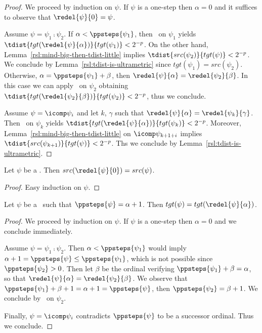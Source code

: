 \begin{proof}
We proceed by induction on $\psi$.
If $\psi$ is a one-step then $\alpha = 0$ and it suffices to observe that $\redel{\psi}{0} = \psi$.

Assume $\psi = \psi_1 \comp \psi_2$.
If $\alpha < \ppsteps{\psi_1}$, then \ih\ on $\psi_1$ yields $\tdist{tgt(\redel{\psi}{\alpha})}{tgt(\psi_1)} < 2^{-p}$.
On the other hand, Lemma~\ref{rsl:mind-big-then-tdist-little} implies $\tdist{src(\psi_2)}{tgt(\psi)} < 2^{-p}$.
We conclude by Lemma~\ref{rsl:tdist-is-ultrametric} since $tgt(\psi_1) = src(\psi_2)$.
Otherwise, $\alpha = \ppsteps{\psi_1} + \beta$, then $\redel{\psi}{\alpha} = \redel{\psi_2}{\beta}$.
In this case we can apply \ih\ on $\psi_2$ obtaining $\tdist{tgt(\redel{\psi_2}{\beta})}{tgt(\psi_2)} < 2^{-p}$, thus we conclude.

Assume $\psi = \icomp \psi_i$ and let $k$, $\gamma$ such that $\redel{\psi}{\alpha} = \redel{\psi_k}{\gamma}$.
Then \ih\ on $\psi_k$ yields $\tdist{tgt(\redel{\psi}{\alpha})}{tgt(\psi_k)} < 2^{-p}$.
Moreover, Lemma~\ref{rsl:mind-big-then-tdist-little} on $\icomp \psi_{k+1+i}$ implies $\tdist{src(\psi_{k+1})}{tgt(\psi)} < 2^{-p}$. Ths we conclude by Lemma~\ref{rsl:tdist-is-ultrametric}.
\end{proof}

\begin{lemma}
\label{rsl:ppterm-src}
Let $\psi$ be a \ppterm. Then $src(\redel{\psi}{0}) = src(\psi)$.
\end{lemma}

\begin{proof}
Easy induction on $\psi$.
\end{proof}

\begin{lemma}
\label{rsl:ppterm-tgt-successor}
Let $\psi$ be a \ppterm\ such that $\ppsteps{\psi} = \alpha + 1$. Then $tgt(\psi) = tgt(\redel{\psi}{\alpha})$.
\end{lemma}

\begin{proof}
We proceed by induction on $\psi$.
If $\psi$ is a one-step then $\alpha = 0$ and we conclude immediately.

Assume $\psi = \psi_1 \comp \psi_2$.
Then $\alpha < \ppsteps{\psi_1}$ would imply $\alpha + 1 = \ppsteps{\psi} \leq \ppsteps{\psi_1}$, which is not possible since $\ppsteps{\psi_2} > 0$.
Then let $\beta$ be the ordinal verifying $\ppsteps{\psi_1} + \beta = \alpha$, so that $\redel{\psi}{\alpha} = \redel{\psi_2}{\beta}$. 
We observe that $\ppsteps{\psi_1} + \beta + 1 = \alpha + 1 = \ppsteps{\psi}$, then $\ppsteps{\psi_2} = \beta + 1$.
We conclude by \ih\ on $\psi_2$.

Finally, $\psi = \icomp \psi_i$ contradicts $\ppsteps{\psi}$ to be a successor ordinal. Thus we conclude.
\end{proof}


